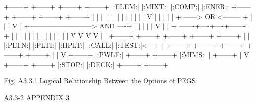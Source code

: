 \newpage {} 
\begin{center}
\begin{boxedverbatim}
 
 
   +------+    +------+    +------+          +------+
   |:ELEM:|    |:MIXT:|    |:COMP:|          |:ENER:|
   +------+    +------+    +------+          +------+
       |          |           |                  |
       |          |           |                  |
       |          |           |                  |
       |          V           |                  |
       |                      |                  |
       + ------> OR <-------- +                  |
                                                 |
                  |                              V
                  |
                  +---------------------------> AND ----+
                  |                                     |
                  |                              |      |
                  V                              |      |
    + -------+----+----+------- +                |      |
    |        |         |        |                |      |
    |        |         |        |                |      |
    V        V         V        V                |      |
 +------+ +------+ +------+ +------+ +------+    |      |
 |:PLTN:| |:PLTI:| |:HPLT:| |:CALL:| |:TEST:|<---+      |
 +------+ +------+ +------+ +------+ +------+           |
                                                        |
                                                        V
                                                     +------+
                                                     |:PWLF:|
 +------+                                            +------+
 |:MIMS:|                                               |
 +------+                                               |
                                                        V
 +------+                                            +------+
 |:STOP:|                                            |:DECK:|
 +------+                                            +------+
 



 
           Fig. A3.3.1  Logical Relationship Between
                       the Options of PEGS



 A3.3-2                                                 APPENDIX 3
\end{boxedverbatim} 
\end{center}
